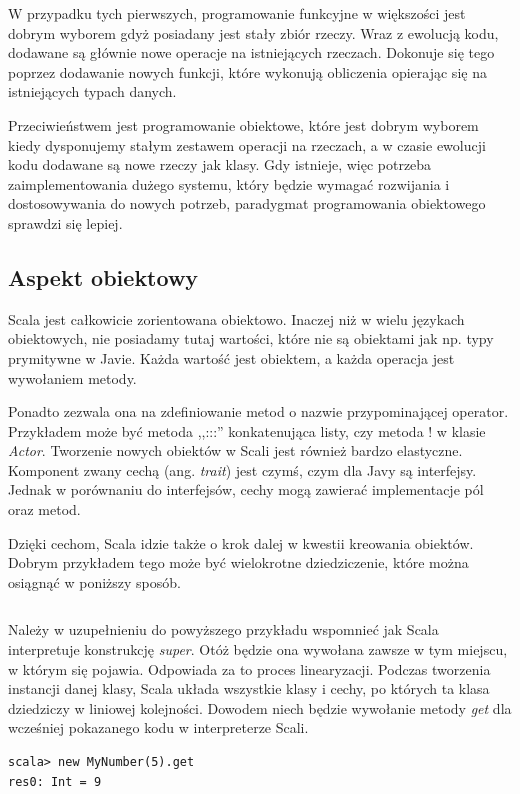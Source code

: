 \documentclass[brudnopis]{xmgr}
\begin{document}
W przypadku tych pierwszych, programowanie funkcyjne w większości jest dobrym wyborem gdyż posiadany jest stały zbiór rzeczy. Wraz z ewolucją kodu, dodawane są głównie nowe operacje na istniejących rzeczach. Dokonuje się tego poprzez dodawanie nowych funkcji, które wykonują obliczenia opierając się na istniejących typach danych. 

Przeciwieństwem jest programowanie obiektowe, które jest dobrym wyborem kiedy dysponujemy stałym zestawem operacji na rzeczach, a w czasie ewolucji kodu dodawane są nowe rzeczy jak klasy. Gdy istnieje, więc potrzeba zaimplementowania dużego systemu, który będzie wymagać rozwijania i dostosowywania do nowych potrzeb, paradygmat programowania obiektowego sprawdzi się lepiej.

\subsection{Aspekt obiektowy}

Scala jest całkowicie zorientowana obiektowo. Inaczej niż w wielu językach obiektowych, nie posiadamy tutaj wartości, które nie są obiektami jak np. typy prymitywne w Javie. Każda wartość jest obiektem, a każda operacja jest wywołaniem metody. 

Ponadto zezwala ona na zdefiniowanie metod o nazwie przypominającej operator. Przykładem może być metoda ,,:::'' konkatenująca listy, czy metoda ! w klasie \textit{Actor}. Tworzenie nowych obiektów w Scali jest również bardzo elastyczne. Komponent zwany cechą (ang. \emph{trait}) jest czymś, czym dla Javy są interfejsy. Jednak w porównaniu do interfejsów, cechy mogą zawierać implementacje pól oraz metod. 

Dzięki cechom, Scala idzie także o krok dalej w kwestii kreowania obiektów. Dobrym przykładem tego może być wielokrotne dziedziczenie, które można osiągnąć w poniższy sposób.

\inputminted[fontsize=\small]{scala}{code/multipleInheritance.scala}

Należy w uzupełnieniu do powyższego przykładu wspomnieć jak Scala interpretuje konstrukcję \emph{super}. Otóż będzie ona wywołana zawsze w tym miejscu, w którym się pojawia. Odpowiada za to proces linearyzacji. Podczas tworzenia instancji danej klasy, Scala układa wszystkie klasy i cechy, po których ta klasa dziedziczy w liniowej kolejności. Dowodem niech będzie wywołanie metody \emph{get} dla wcześniej pokazanego kodu w interpreterze Scali.

\begin{verbatim}
scala> new MyNumber(5).get
res0: Int = 9
\end{verbatim}
\end{document}
